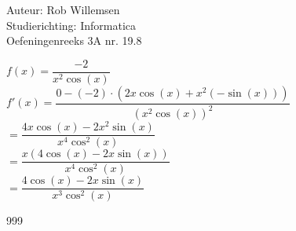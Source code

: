 \documentclass[a4paper]{article}
\begin{document}
\noindent \large Auteur: Rob Willemsen \\
\noindent \large Studierichting: Informatica\\
\noindent \large Oefeningenreeks 3A nr. 19.8\\

\medskip

\normalsize

$f(x) = \dfrac{-2}{x^2 \cos(x)}$ \\

$f'(x) = \dfrac{0 - (-2) \cdot \left(2x \cos(x) + x^2 (-\sin(x))\right)}{(x^2 \cos(x))^2}$ \\

$= \dfrac{4x \cos(x) - 2x^2 \sin(x)}{x^4 \cos^2(x)}$ \\

$= \dfrac{x(4 \cos(x) - 2x \sin(x))}{x^4 \cos^2(x)}$ \\

$= \dfrac{4 \cos(x) - 2x \sin(x)}{x^3 \cos^2(x)}$ \\

\begin{thebibliography}{999}
\end{thebibliography}
\end{document}
